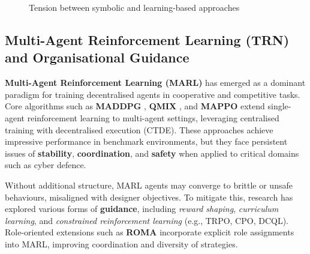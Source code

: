 \documentclass[a4paper,10pt,twocolumn]{article}
\begin{document}
\begin{figure}[h!]
    \centering
    \caption{Tension between symbolic and learning-based approaches}
    \label{fig:tension-symbolic-learning}
\end{figure}


\subsection{Multi-Agent Reinforcement Learning (TRN) and Organisational Guidance}

\textbf{Multi-Agent Reinforcement Learning (MARL)} has emerged as a
dominant paradigm for training decentralised agents in cooperative and
competitive tasks. Core algorithms such as \textbf{MADDPG}
\cite{lowe2017}, \textbf{QMIX} \cite{rashid2018}, and
\textbf{MAPPO} extend single-agent reinforcement learning to multi-agent
settings, leveraging centralised training with decentralised execution
(CTDE). These approaches achieve impressive performance in benchmark
environments, but they face persistent issues of \textbf{stability},
\textbf{coordination}, and \textbf{safety} when applied to critical
domains such as cyber defence.

Without additional structure, MARL agents may converge to brittle or
unsafe behaviours, misaligned with designer objectives. To mitigate
this, research has explored various forms of \textbf{guidance},
including \textit{reward shaping}, \textit{curriculum learning}, and
\textit{constrained reinforcement learning} (e.g., TRPO, CPO, DCQL).
Role-oriented extensions such as \textbf{ROMA} incorporate explicit
role assignments into MARL, improving coordination and diversity of
strategies.
\end{document}
